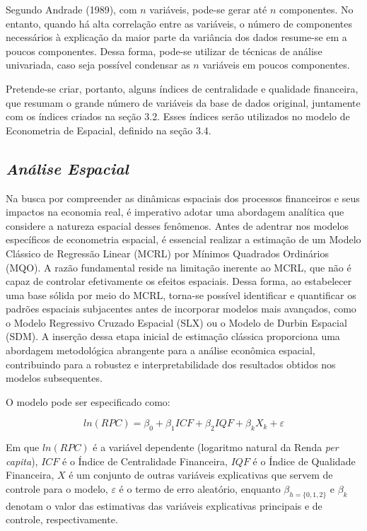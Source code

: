 \documentclass[a4paper,12pt]{article}
\begin{document}
Segundo Andrade (1989), com \(n\) variáveis, pode-se gerar até \(n\)
componentes. No entanto, quando há alta correlação entre as variáveis, o
número de componentes necessários à explicação da maior parte da
variância dos dados resume-se em a poucos componentes. Dessa forma,
pode-se utilizar de técnicas de análise univariada, caso seja possível
condensar as \(n\) variáveis em poucos componentes.

Pretende-se criar, portanto, alguns índices de centralidade e qualidade
financeira, que resumam o grande número de variáveis da base de dados
original, juntamente com os índices criados na seção 3.2. Esses índices
serão utilizados no modelo de Econometria de Espacial, definido na seção
3.4.

\hypertarget{anuxe1lise-espacial}{%
\subsection{\texorpdfstring{\emph{Análise
Espacial}}{Análise Espacial}}\label{anuxe1lise-espacial}}

Na busca por compreender as dinâmicas espaciais dos processos
financeiros e seus impactos na economia real, é imperativo adotar uma
abordagem analítica que considere a natureza espacial desses fenômenos.
Antes de adentrar nos modelos específicos de econometria espacial, é
essencial realizar a estimação de um Modelo Clássico de Regressão Linear
(MCRL) por Mínimos Quadrados Ordinários (MQO). A razão fundamental
reside na limitação inerente ao MCRL, que não é capaz de controlar
efetivamente os efeitos espaciais. Dessa forma, ao estabelecer uma base
sólida por meio do MCRL, torna-se possível identificar e quantificar os
padrões espaciais subjacentes antes de incorporar modelos mais
avançados, como o Modelo Regressivo Cruzado Espacial (SLX) ou o Modelo
de Durbin Espacial (SDM). A inserção dessa etapa inicial de estimação
clássica proporciona uma abordagem metodológica abrangente para a
análise econômica espacial, contribuindo para a robustez e
interpretabilidade dos resultados obtidos nos modelos subsequentes.

O modelo pode ser especificado como:

\begin{equation}
ln(RPC) = \beta_0 + \beta_1 ICF + \beta_2 IQF + \beta_k X_k + \varepsilon
\end{equation}

Em que \(ln(RPC)\) é a variável dependente (logaritmo natural da Renda
\emph{per capita}), \(ICF\) é o Índice de Centralidade Financeira,
\(IQF\) é o Índice de Qualidade Financeira, \(X\) é um conjunto de
outras variáveis explicativas que servem de controle para o modelo,
\(\varepsilon\) é o termo de erro aleatório, enquanto
\(\beta_{h = \{0,1,2\}}\) e \(\beta_k\) denotam o valor das estimativas
das variáveis explicativas principais e de controle, respectivamente.
\end{document}
